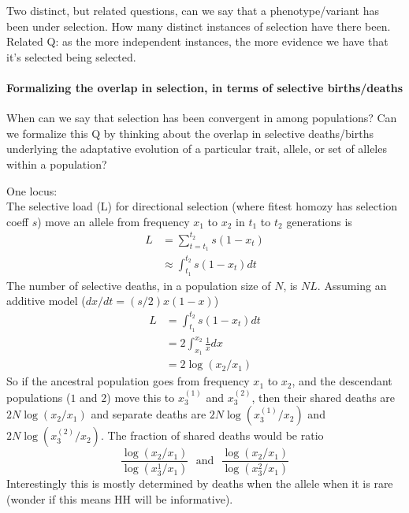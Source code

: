 \documentclass[a4paper,10pt]{article}
\begin{document}
Two distinct, but related questions, can we say that a phenotype/variant has been under selection. How many distinct instances of selection have there been. 
Related Q: as the more independent instances, the more evidence we have that it's
selected being selected.  

\paragraph{Formalizing the overlap in selection, in terms of selective
births/deaths}
When can we say that selection has been convergent in among populations?
Can we formalize this Q by thinking about the overlap in selective
deaths/births underlying the adaptative evolution of a particular trait, allele, or set of alleles within a population?

One locus:\\
The selective load (L) for directional selection (where fitest homozy
has selection coeff $s$) move an allele from frequency $x_1$ to $x_2$
in $t_1$ to $t_2$ generations is
\begin{align}
L &= \sum_{t=t_1}^{t_2} s(1-x_t) \\
&\approx \int_{t_1}^{t_2}  s(1-x_t) dt
\end{align}
The number of selective deaths, in a population size of $N$, is
$NL$. Assuming an additive model ($dx/dt = (s/2)x(1-x)$) 
\begin{align}
L &= \int_{t_1}^{t_2}  s(1-x_t) dt\\
&= 2  \int_{x_1}^{x_2}  \frac{1}{x} dx\\
& = 2 \log(x_2/x_1) 
\end{align}
So if the ancestral population goes from frequency $x_1$ to $x_2$, and
the descendant populations ($1$ and $2$) move this to $x_3^{(1)}$ and
$x_3^{(2)}$, then their shared deaths are $2N\log(x_2/x_1)$ and separate
deaths are $2N\log(x_3^{(1)}/x_2)$ and
$2N\log(x_3^{(2)}/x_2)$. The fraction of shared deaths would be ratio
\begin{equation}
\frac{\log(x_2/x_1)}{\log(x_3^{1}/x_1)}~~~\textrm{and}~~~\frac{\log(x_2/x_1)}{\log(x_3^{2}/x_1)}
\end{equation}
Interestingly this is mostly determined by deaths when the
allele when it is rare (wonder if this means HH will be informative).\\
\end{document}
